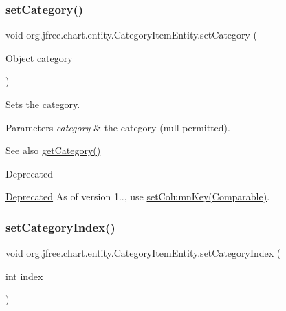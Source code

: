 \subsubsection{\texorpdfstring{set\+Category()}{setCategory()}}
{\footnotesize\ttfamily void org.\+jfree.\+chart.\+entity.\+Category\+Item\+Entity.\+set\+Category (\begin{DoxyParamCaption}\item[{Object}]{category }\end{DoxyParamCaption})}

Sets the category.


\begin{DoxyParams}{Parameters}
{\em category} & the category ({\ttfamily null} permitted).\\
\hline
\end{DoxyParams}
\begin{DoxySeeAlso}{See also}
\mbox{\hyperlink{classorg_1_1jfree_1_1chart_1_1entity_1_1_category_item_entity_ae666760c5bb7e48704f020551dec0b5b}{get\+Category()}}
\end{DoxySeeAlso}
\begin{DoxyRefDesc}{Deprecated}
\item[\mbox{\hyperlink{deprecated__deprecated000044}{Deprecated}}]As of version 1.., use \mbox{\hyperlink{classorg_1_1jfree_1_1chart_1_1entity_1_1_category_item_entity_ab91210c9acc7d24595eca4a5a414b85d}{set\+Column\+Key(\+Comparable)}}. \end{DoxyRefDesc}
\mbox{\label{classorg_1_1jfree_1_1chart_1_1entity_1_1_category_item_entity_af1892446208864ef07d1954e8c32b4cb}} 
\subsubsection{\texorpdfstring{set\+Category\+Index()}{setCategoryIndex()}}
{\footnotesize\ttfamily void org.\+jfree.\+chart.\+entity.\+Category\+Item\+Entity.\+set\+Category\+Index (\begin{DoxyParamCaption}\item[{int}]{index }\end{DoxyParamCaption})}

